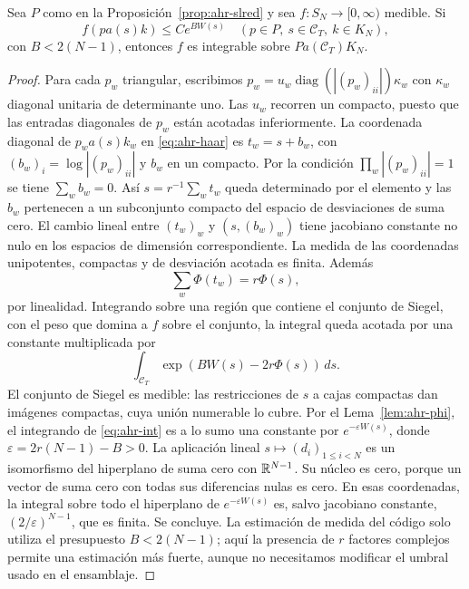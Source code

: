 \begin{proposicion}
\label{prop:ahr-int}
Sea $P$ como en la Proposición~\ref{prop:ahr-slred} y sea $f:S_N\to[0,\infty)$ medible. Si
\[
 f(p a(s)k)\le C e^{B W(s)}
 \quad(p\in P,\ s\in\mathcal C_T,\ k\in K_N),
\]
con $B<2(N-1)$, entonces $f$ es integrable sobre $P a(\mathcal C_T)K_N$.
\end{proposicion}
\begin{proof}
Para cada $p_w$ triangular, escribimos $p_w=u_w\operatorname{diag}(|(p_w)_{ii}|)\kappa_w$ con $\kappa_w$ diagonal unitaria de determinante uno. Las $u_w$ recorren un compacto, puesto que las entradas diagonales de $p_w$ están acotadas inferiormente. La coordenada diagonal de $p_w a(s) k_w$ en \eqref{eq:ahr-haar} es $t_w=s+b_w$, con $(b_w)_i=\log|(p_w)_{ii}|$ y $b_w$ en un compacto. Por la condición $\prod_w|(p_w)_{ii}|=1$ se tiene $\sum_w b_w=0$. Así $s=r^{-1}\sum_w t_w$ queda determinado por el elemento y las $b_w$ pertenecen a un subconjunto compacto del espacio de desviaciones de suma cero. El cambio lineal entre $(t_w)_w$ y $(s,(b_w)_w)$ tiene jacobiano constante no nulo en los espacios de dimensión correspondiente. La medida de las coordenadas unipotentes, compactas y de desviación acotada es finita. Además
\[
 \sum_w\Phi(t_w)=r\Phi(s),
\]
por linealidad. Integrando sobre una región que contiene el conjunto de Siegel, con el peso que domina a $f$ sobre el conjunto, la integral queda acotada por una constante multiplicada por
\begin{equation}
 \int_{\mathcal C_T}\exp(BW(s)-2r\Phi(s))\,ds.
 \label{eq:ahr-int}
\end{equation}
El conjunto de Siegel es medible: las restricciones de $s$ a cajas compactas dan imágenes compactas, cuya unión numerable lo cubre. Por el Lema~\ref{lem:ahr-phi}, el integrando de \eqref{eq:ahr-int} es a lo sumo una constante por $e^{-\varepsilon W(s)}$, donde $\varepsilon=2r(N-1)-B>0$. La aplicación lineal $s\mapsto(d_i)_{1\le i<N}$ es un isomorfismo del hiperplano de suma cero con $\mathbb{R}^{N-1}$. Su núcleo es cero, porque un vector de suma cero con todas sus diferencias nulas es cero. En esas coordenadas, la integral sobre todo el hiperplano de $e^{-\varepsilon W(s)}$ es, salvo jacobiano constante, $(2/\varepsilon)^{N-1}$, que es finita. Se concluye. La estimación de medida del código solo utiliza el presupuesto $B<2(N-1)$; aquí la presencia de $r$ factores complejos permite una estimación más fuerte, aunque no necesitamos modificar el umbral usado en el ensamblaje.
\end{proof}

